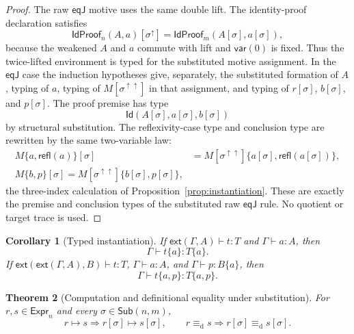 \documentclass[10pt,reqno]{amsart}
\newtheorem{theorem}{Theorem}[section]
\newtheorem{corollary}[theorem]{Corollary}
\newcommand{\Expr}{\mathsf{Expr}}
\newcommand{\Ext}[2]{\mathsf{ext}(#1,#2)}
\newcommand{\Sub}{\mathsf{Sub}}
\newcommand{\Var}{\mathsf{var}}
\newcommand{\IdTy}{\mathsf{Id}}
\newcommand{\Refl}{\mathsf{refl}}
\newcommand{\EqJ}{\mathsf{eqJ}}
\newcommand{\defeq}{\mathrel{\equiv_{\mathrm d}}}
\newcommand{\red}{\mathrel{\longmapsto}}
\newcommand{\lift}{\uparrow}
\begin{document}
\begin{proof}
The raw \(\EqJ\) motive uses the same double lift.  The identity-proof
declaration satisfies
\[
 \mathsf{IdProof}_n(A,a)[\sigma^\lift]
   =\mathsf{IdProof}_m(A[\sigma],a[\sigma]),
\tag{5.5}\label{eq:id-proof-substitution}
\]
because the weakened \(A\) and \(a\) commute with lift and \(\Var(0)\) is
fixed.  Thus the twice-lifted environment is typed for the substituted motive
assignment.  In the \(\EqJ\) case the induction hypotheses give, separately,
the substituted formation of \(A\), typing of \(a\), typing of
\(M[\sigma^{\lift\lift}]\) in that assignment, and typing of
\(r[\sigma]\), \(b[\sigma]\), and \(p[\sigma]\).  The proof premise has type
\[
 \IdTy(A[\sigma],a[\sigma],b[\sigma])
\]
by structural substitution.  The reflexivity-case type and conclusion type
are rewritten by the same two-variable law:
\[
 \begin{aligned}
 M\{a,\Refl(a)\}[\sigma]
  &=M[\sigma^{\lift\lift}]
       \{a[\sigma],\Refl(a[\sigma])\},\\
 M\{b,p\}[\sigma]
  =M[\sigma^{\lift\lift}]\{b[\sigma],p[\sigma]\},
 \end{aligned}
\]
the three-index calculation of Proposition~\ref{prop:instantiation}.  These
are exactly the premise and conclusion types of the substituted raw
\(\EqJ\) rule.
No quotient or target trace is used.
\end{proof}

\begin{corollary}[Typed instantiation]
\label{cor:typed-instantiation}
If \(\Ext{\Gamma}{A}\vdash t:T\) and \(\Gamma\vdash a:A\), then
\[
             \Gamma\vdash t\{a\}:T\{a\}.
\]
If \(\Ext{\Ext{\Gamma}{A}}{B}\vdash t:T\), \(\Gamma\vdash a:A\), and
\(\Gamma\vdash p:B\{a\}\), then
\[
             \Gamma\vdash t\{a,p\}:T\{a,p\}.
\]
\end{corollary}

\begin{theorem}[Computation and definitional equality under substitution]
\label{thm:computation-substitution}
For \(r,s\in\Expr_n\) and every \(\sigma\in\Sub(n,m)\),
\[
 r\red s\Longrightarrow r[\sigma]\red s[\sigma],
 \qquad
 r\defeq s\Longrightarrow r[\sigma]\defeq s[\sigma].
\]
\end{theorem}
\end{document}
